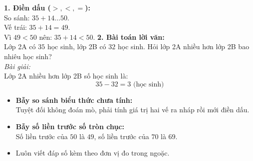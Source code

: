\documentclass[11pt,a4paper]{article}
\begin{document}
\vspace{-1.5mm}
\noindent
\begin{minipage}[t]{0.49\textwidth}\vspace{0pt}
\begin{tcolorbox}[
  enhanced,
  colback=green!4!white,
  colframe=green!60!black,
  arc=2mm, boxrule=0.8pt,
  left=2mm, right=2mm, top=1.8mm, bottom=1.8mm,
  title={\footnotesize\bfseries\color{white}\faCheckCircle\ 4. Ví dụ thực hành chuẩn mực}
]
{\footnotesize
\textbf{1. Điền dấu ($>, <, =$):}\\
So sánh: $35 + 14 \dots 50$.\\
Vế trái: $35 + 14 = 49$.\\
Vì $49 < 50$ nên: $35 + 14 < 50$.
\textbf{2. Bài toán lời văn:}\\
Lớp 2A có $35$ học sinh, lớp 2B có $32$ học sinh. Hỏi lớp 2A nhiều hơn lớp 2B bao nhiêu học sinh?\\
\textit{Bài giải:}\\
Lớp 2A nhiều hơn lớp 2B số học sinh là:
$$35 - 32 = 3\text{ (học sinh)}$$
}
\end{tcolorbox}
\end{minipage}
\hfill
\begin{minipage}[t]{0.49\textwidth}\vspace{0pt}
\begin{tcolorbox}[
  enhanced,
  colback=red!4!white,
  colframe=red!75!black,
  arc=2mm, boxrule=0.8pt,
  left=2mm, right=2mm, top=1.8mm, bottom=1.8mm,
  title={\footnotesize\bfseries\color{white}\faExclamationTriangle\ 5. Mẹo tránh bẫy trắc nghiệm}
]
{\footnotesize
\begin{itemize}\setlength{\itemsep}{1pt}\setlength{\leftskip}{-2.5mm}
  \item \textbf{Bẫy so sánh biểu thức chưa tính:}\\
  Tuyệt đối không đoán mò, phải tính giá trị hai vế ra nháp rồi mới điền dấu.
  \item \textbf{Bẫy số liền trước số tròn chục:}\\
  Số liền trước của $50$ là $49$, số liền trước của $70$ là $69$.
  \item Luôn viết đáp số kèm theo đơn vị đo trong ngoặc.
\end{itemize}
}
\end{tcolorbox}
\end{minipage}
\end{document}
